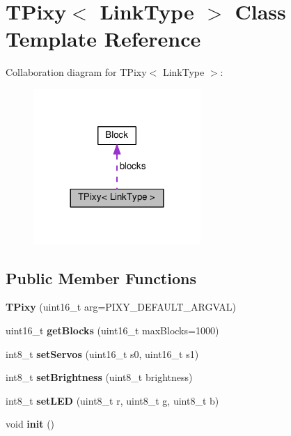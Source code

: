 \hypertarget{class_t_pixy}{}\section{T\+Pixy$<$ Link\+Type $>$ Class Template Reference}
\label{class_t_pixy}


Collaboration diagram for T\+Pixy$<$ Link\+Type $>$\+:\nopagebreak
\begin{figure}[H]
\begin{center}
\leavevmode
\includegraphics[width=180pt]{class_t_pixy__coll__graph}
\end{center}
\end{figure}
\subsection*{Public Member Functions}
\begin{DoxyCompactItemize}
\item 
{\bfseries T\+Pixy} (uint16\+\_\+t arg=P\+I\+X\+Y\+\_\+\+D\+E\+F\+A\+U\+L\+T\+\_\+\+A\+R\+G\+V\+AL)\hypertarget{class_t_pixy_a6d28834f2de08fc0dd514e854d91c963}{}\label{class_t_pixy_a6d28834f2de08fc0dd514e854d91c963}

\item 
uint16\+\_\+t {\bfseries get\+Blocks} (uint16\+\_\+t max\+Blocks=1000)\hypertarget{class_t_pixy_adea9ba4b37f132747ced41d1a398171b}{}\label{class_t_pixy_adea9ba4b37f132747ced41d1a398171b}

\item 
int8\+\_\+t {\bfseries set\+Servos} (uint16\+\_\+t s0, uint16\+\_\+t s1)\hypertarget{class_t_pixy_a8d768d7d679742d487a44a6af85ccecd}{}\label{class_t_pixy_a8d768d7d679742d487a44a6af85ccecd}

\item 
int8\+\_\+t {\bfseries set\+Brightness} (uint8\+\_\+t brightness)\hypertarget{class_t_pixy_a8c9f442eff27c2fd563da0df9d397d42}{}\label{class_t_pixy_a8c9f442eff27c2fd563da0df9d397d42}

\item 
int8\+\_\+t {\bfseries set\+L\+ED} (uint8\+\_\+t r, uint8\+\_\+t g, uint8\+\_\+t b)\hypertarget{class_t_pixy_a938f7b3d42778ecf8bff8f6eb58ff1c8}{}\label{class_t_pixy_a938f7b3d42778ecf8bff8f6eb58ff1c8}

\item 
void {\bfseries init} ()\hypertarget{class_t_pixy_a9cfbacc18dd014a52926a0239927e29a}{}\label{class_t_pixy_a9cfbacc18dd014a52926a0239927e29a}

\end{DoxyCompactItemize}
